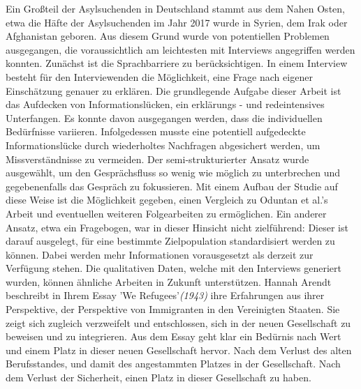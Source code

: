 Ein Gro\ss{}teil der Asylsuchenden in Deutschland stammt aus dem Nahen Osten, etwa die H\"afte der Asylsuchenden im Jahr 2017 wurde in Syrien, dem Irak oder Afghanistan geboren\citep{asylum2017seekers}. Aus diesem Grund wurde von potentiellen Problemen ausgegangen, die voraussichtlich am leichtesten mit Interviews angegriffen werden konnten.\newline
Zun\"achst ist die Sprachbarriere zu ber\"ucksichtigen. In einem Interview besteht f\"ur den Interviewenden die M\"oglichkeit, eine Frage nach eigener Einsch\"atzung genauer zu erkl\"aren.
Die grundlegende Aufgabe dieser Arbeit ist das Aufdecken von Informationsl\"ucken, ein erkl\"arungs - und redeintensives Unterfangen. Es konnte davon ausgegangen werden, dass die individuellen Bed\"urfnisse variieren. Infolgedessen musste eine potentiell aufgedeckte Informationsl\"ucke durch wiederholtes Nachfragen abgesichert werden, um Missverst\"andnisse zu vermeiden.\newline
Der semi-strukturierter Ansatz wurde ausgew\"ahlt, um den Gespr\"achsfluss so wenig wie m\"oglich zu unterbrechen und gegebenenfalls das Gespr\"ach zu fokussieren.\newline
Mit einem Aufbau der Studie auf diese Weise ist die M\"oglichkeit gegeben, einen Vergleich zu Oduntan et al.'s Arbeit und eventuellen weiteren Folgearbeiten zu ermöglichen.\newline
Ein anderer Ansatz, etwa ein Fragebogen, war in dieser Hinsicht nicht zielf\"uhrend: Dieser ist darauf ausgelegt, f\"ur eine bestimmte Zielpopulation standardisiert werden zu k\"onnen. Dabei werden mehr Informationen vorausgesetzt als derzeit zur Verf\"ugung stehen.\newline
Die qualitativen Daten, welche mit den Interviews generiert wurden, k\"onnen \"ahnliche Arbeiten in Zukunft unterst\"utzen.\newline
%
Hannah Arendt beschreibt in Ihrem Essay 'We Refugees'\textit{(1943)} ihre Erfahrungen aus ihrer Perspektive, der Perspektive von Immigranten in den Vereinigten Staaten. Sie zeigt sich zugleich verzweifelt und entschlossen, sich in der neuen Gesellschaft zu beweisen und zu integrieren.\newline
Aus dem Essay geht klar ein Bedürnis nach Wert und einem Platz in dieser neuen Gesellschaft hervor.\newline
Nach dem Verlust des alten Berufsstandes, und damit des angestammten Platzes in der Gesellschaft. \newline
Nach dem Verlust der Sicherheit, einen Platz in dieser Gesellschaft zu haben.\newline

